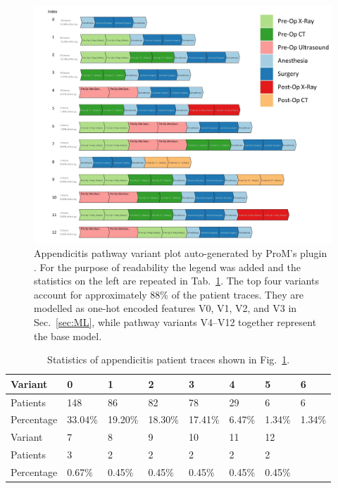 \begin{figure}[t]
\hspace{-2cm}
\includegraphics[width=1.5\textwidth]{images/appendicitis_variant_index_anes.jpg}
\caption{Appendicitis pathway variant plot auto-generated by ProM's
  plugin . 
  For the purpose of readability the legend was added and the
  statistics on the left are repeated in Tab.~\ref{table:appendicitis variant table}.
 The top four variants account for approximately 88\% of the patient
 traces. They are modelled as one-hot encoded features V0, V1, V2, and V3
 in Sec.~\ref{sec:ML}, while pathway variants V4--V12 together represent
 the base model.
 }
\label{fig:appendicitis pathway variants}
\end{figure}
\clearpage

\begin{table}[t]
\centering
\caption{Statistics of appendicitis patient traces shown in Fig.~\ref{fig:appendicitis pathway variants}.}
\label{table:appendicitis variant table}
\begin{tabular}{llllllll}
  \hline
  \hline
Variant &     0  &     1  &     2  &     3  &    4  &    5  &    6  \\
\hline
Patients   &    148 &     86 &     82 &     78 &    29 &     6 &     6 \\
  Percentage &  33.04\% &  19.20\% &  18.30\% &  17.41\% &  6.47\% &  1.34\% &  1.34\%\\
  \hline
  \hline
Variant &     7  &    8  &    9  &    10 &    11 &    12 \\
\hline
Patients   &   3 &     2 &     2 &     2 &     2 &     2 \\
Percentage &  0.67\% &  0.45\% &  0.45\% &  0.45\% &  0.45\% &  0.45\% \\
  \hline
  \hline
\end{tabular}
\end{table}

